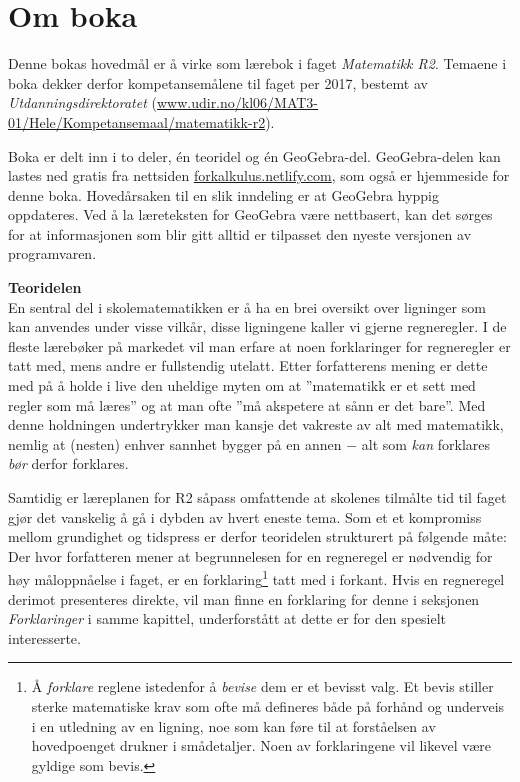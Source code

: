 


	
\section*{Om boka}
Denne bokas hovedmål er å virke som lærebok i faget \textsl{Matematikk R2}. Temaene i boka dekker derfor kompetansemålene til faget per 2017, bestemt av \textsl{Utdanningsdirektoratet} (\url{www.udir.no/kl06/MAT3-01/Hele/Kompetansemaal/matematikk-r2}).\vsk

Boka er delt inn i to deler, én teoridel og én GeoGebra-del. GeoGebra-delen kan lastes ned gratis fra nettsiden \url{forkalkulus.netlify.com}, som også er hjemmeside for denne boka. Hovedårsaken til en slik inndeling er at GeoGebra hyppig oppdateres. Ved å la læreteksten for GeoGebra være nettbasert, kan det sørges for at informasjonen som blir gitt alltid er tilpasset den nyeste versjonen av programvaren.\vsk

\textbf{Teoridelen}\\
En sentral del i skolematematikken er å ha en brei oversikt over ligninger som kan anvendes under visse vilkår, disse ligningene kaller vi gjerne regneregler. I de fleste lærebøker på markedet vil man erfare at noen forklaringer for regneregler er tatt med, mens andre er fullstendig utelatt. Etter forfatterens mening er dette med på å holde i live den uheldige myten om at ''matematikk er et sett med regler som må læres'' og at man ofte ''må akspetere at sånn er det bare''. Med denne holdningen undertrykker man kansje det vakreste av alt med matematikk, nemlig at (nesten) enhver sannhet bygger på en annen $ - $ alt som \textsl{kan} forklares \textsl{bør} derfor forklares.\vsk

Samtidig er læreplanen for R2 såpass omfattende at skolenes tilmålte tid til faget gjør det vanskelig å gå i dybden av hvert eneste tema. Som et et kompromiss mellom grundighet og tidspress er derfor teoridelen strukturert på følgende måte: Der hvor forfatteren mener at begrunnelesen for en regneregel er nødvendig for høy måloppnåelse i faget, er en forklaring\footnote{Å \textsl{forklare} reglene istedenfor å \textsl{bevise} dem er et bevisst valg. Et bevis stiller sterke matematiske krav som ofte må defineres både på forhånd og underveis i en utledning av en ligning, noe som kan føre til at forståelsen av hovedpoenget drukner i smådetaljer. Noen av forklaringene vil likevel være gyldige som bevis.} tatt med i forkant. Hvis en regneregel derimot presenteres direkte, vil man finne en forklaring for denne i seksjonen \textsl{Forklaringer} i samme kapittel, underforstått at dette er for den spesielt interesserte.\vsk

